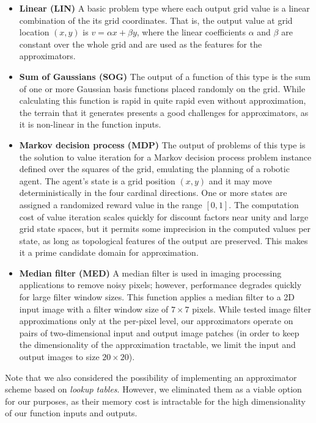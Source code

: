 \documentclass{article}
\begin{document}
\begin{itemize}
\item \textbf{Linear (LIN)} A basic problem type where each output grid value is a linear combination of the its grid coordinates. That is, the output value at grid location $(x, y)$ is $v = \alpha x + \beta y$, where the linear coefficients $\alpha$ and $\beta$ are constant over the whole grid and are used as the features for the approximators.

\item \textbf{Sum of Gaussians (SOG)} The output of a function of this type is the sum of one or more Gaussian basis functions placed randomly on the grid. While calculating this function is rapid in quite rapid even without approximation, the terrain that it generates presents a good challenges for approximators, as it is non-linear in the function inputs.

\item \textbf{Markov decision process (MDP)} The output of problems of this type is the solution to value iteration for a Markov decision process problem instance defined over the squares of the grid, emulating the planning of a robotic agent. The agent's state is a grid position $(x, y)$ and it may move deterministically in the four cardinal directions. One or more states are assigned a randomized reward value in the range $[0, 1]$. The computation cost of value iteration scales quickly for discount factors near unity and large grid state spaces, but it permits some imprecision in the computed values per state, as long as topological features of the output are preserved. This makes it a prime candidate domain for approximation.

\item \textbf{Median filter (MED)} A median filter is used in imaging processing applications to remove noisy pixels; however, performance degrades quickly for large filter window sizes. This function applies a median filter to a 2D input image with a filter window size of $7 \times 7$ pixels. While \cite{Esmaeilzadeh12} tested image filter approximations only at the per-pixel level, our approximators operate on pairs of two-dimensional input and output image patches (in order to keep the dimensionality of the approximation tractable, we limit the input and output images to size $20 \times 20$).
\end{itemize}

Note that we also considered the possibility of implementing an approximator scheme based on \textit{lookup tables}. However, we eliminated them as a viable option for our purposes, as their memory cost is intractable for the high dimensionality of our function inputs and outputs.
\end{document}
